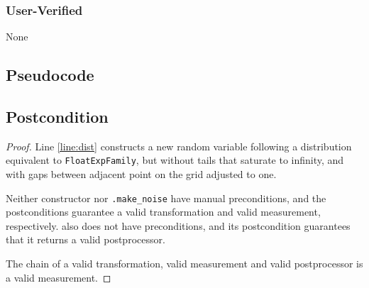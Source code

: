 \documentclass{article}
\begin{document}
\subsubsection*{User-Verified}
None

\subsection*{Pseudocode}


\subsection*{Postcondition}
\begin{theorem}
\end{theorem}

\begin{proof}
    Line \ref{line:dist} constructs a new random variable following a distribution equivalent to \texttt{FloatExpFamily}, 
    but without tails that saturate to infinity, and with gaps between adjacent point on the grid adjusted to one.

    Neither constructor  nor
    \texttt{.make\_noise} have manual preconditions, 
    and the postconditions guarantee a valid transformation and valid measurement, respectively.
     also does not have preconditions,
    and its postcondition guarantees that it returns a valid postprocessor.

    The chain of a valid transformation, valid measurement and valid postprocessor is a valid measurement.
\end{proof}
\end{document}
